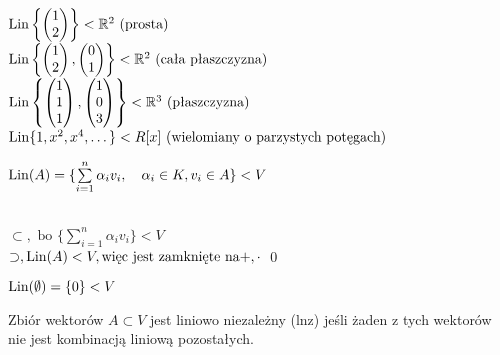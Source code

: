 \begin{przy}
    ~\\
    $\operatorname{Lin}\left\{
        \begin{pmatrix}
            1 \\
            2
        \end{pmatrix}
    \right\} < \mathbb{R}^2 \text{ (prosta)}
    $ \\
    $\operatorname{Lin}\left\{
        \begin{pmatrix}
            1 \\
            2
        \end{pmatrix},
        \begin{pmatrix}
            0 \\
            1
        \end{pmatrix}
        \right\} < \mathbb{R}^2 \text{ (cała płaszczyzna)}
    $\\
    $
        \operatorname{Lin}\left\{
        \begin{pmatrix}
            1 \\
            1 \\
            1
        \end{pmatrix},
        \begin{pmatrix}
            1 \\
            0 \\
            3
        \end{pmatrix}
        \right\} < \mathbb{R}^3 \text{ (płaszczyzna)}
    $ \\
    $
        \operatorname{Lin}\{1,x^2,x^4,\dots\} < R[x] \text{ (wielomiany o parzystych potęgach)}
    $
\end{przy}

\begin{ft}
    $\operatorname{Lin}(A) = \{ \sum\limits_{i=1}^{n} \alpha_i v_i, \quad \alpha_i \in K, v_i \in A\} < V$
\end{ft}

\begin{dd}
    ~\\
    $\subset, \text{ bo } \{ \sum\limits_{i=1}^{n} \alpha_i v_i\} < V$ \\
    $\supset, \operatorname{Lin}(A) < V, \text{więc jest zamknięte na} +,\cdot$
    \qed
\end{dd}
\begin{uw}
    $\operatorname{Lin}(\emptyset)=\{0\} < V $
\end{uw}

\begin{df}
    Zbiór wektorów $ A \subset V $ jest liniowo niezależny (lnz) jeśli żaden z tych wektorów nie jest kombinacją liniową pozostałych.
\end{df}

